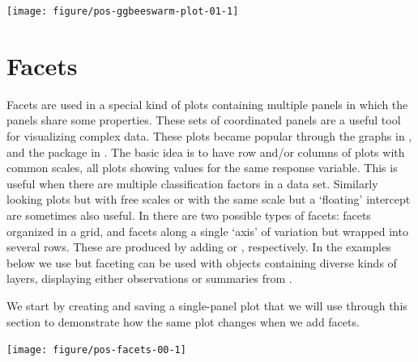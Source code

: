 \documentclass[krantz2]{krantz}\usepackage{knitr}%
\begin{document}
\begin{knitrout}\footnotesize
{}\color{fgcolor}\begin{kframe}
\begin{alltt}
  \hlopt{+}
  \hlstd{()}
\end{alltt}
\end{kframe}

{\centering \texttt{[image: figure/pos-ggbeeswarm-plot-01-1]} 

}



\end{knitrout}


\section{Facets}
Facets are used in a special kind of plots containing multiple panels in which the panels share some properties.
These sets of coordinated panels are a useful tool for visualizing complex data. These plots became popular through the  graphs in , and the  package in \Rlang. The basic idea is to have row and/or columns of plots with common scales, all plots showing values for the same response variable. This is useful when there are multiple classification factors in a data set. Similarly looking plots but with free scales or with the same scale but a `floating' intercept are sometimes also useful. In \ggplot there are two possible types of facets: facets organized in a grid, and facets along a single `axis' of variation but wrapped into several rows. These are produced by adding  or , respectively. In the examples below we use  but faceting can be used with  objects containing diverse kinds of layers, displaying either observations or summaries from .



We start by creating and saving a single-panel plot that we will use through this section to demonstrate how the same plot changes when we add facets.

\begin{knitrout}\footnotesize
{}\color{fgcolor}\begin{kframe}
\begin{alltt}
 \hlkwb{<-} \hlstd{(}   \hlopt{+}
  \hlstd{()}
\end{alltt}
\end{kframe}

{\centering \texttt{[image: figure/pos-facets-00-1]} 

}



\end{knitrout}
\end{document}
